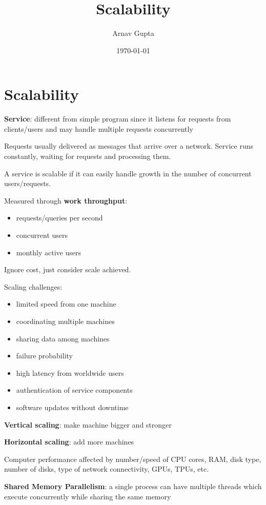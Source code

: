 \documentclass[11pt]{article}
\author{Arnav Gupta}
\date{\today}
\title{Scalability}
\begin{document}
\maketitle
\tableofcontents

\section{Scalability}
\label{sec:orgcdbeadf}
\textbf{Service}: different from simple program since it listens for requests from
clients/users and may handle multiple requests concurrently

Requests usually delivered as messages that arrive over a network.
Service runs constantly, waiting for requests and processing them.

A service is scalable if it can easily handle growth in the number of
concurrent users/requests.

Measured through \textbf{work throughput}:
\begin{itemize}
\item requests/queries per second
\item concurrent users
\item monthly active users
\end{itemize}

Ignore cost, just consider scale achieved.

Scaling challenges:
\begin{itemize}
\item limited speed from one machine
\item coordinating multiple machines
\item sharing data among machines
\item failure probability
\item high latency from worldwide users
\item authentication of service components
\item software updates without downtime
\end{itemize}

\textbf{Vertical scaling}: make machine bigger and stronger

\textbf{Horizontal scaling}: add more machines

Computer performance affected by number/speed of CPU cores, RAM, disk type,
number of disks, type of network connectivity, GPUs, TPUs, etc.

\textbf{Shared Memory Parallelism}: a single process can have multiple threads which execute
concurrently while sharing the same memory
\end{document}
